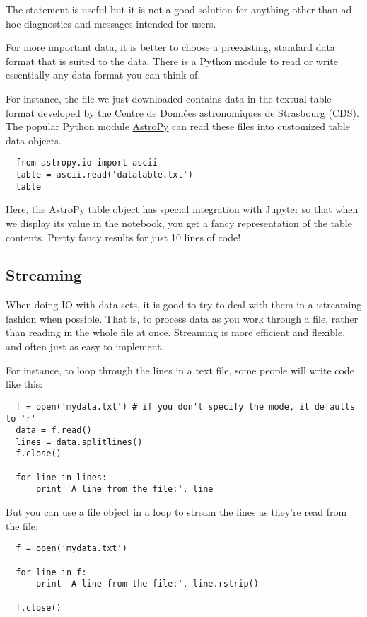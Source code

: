 \documentclass[letterpaper, 12pt, titlepage, twoside]{article}
\begin{document}
The  statement is useful but it is not a good solution for anything
other than ad-hoc diagnostics and messages intended for users.

For more important data, it is better to choose a preexisting, standard data
format that is suited to the data. There is a Python module to read or write
essentially any data format you can think of.

For instance, the file we just downloaded contains data in the textual table
format developed by the Centre de Données astronomiques de Strasbourg (CDS).
The popular Python module \href{http://www.astropy.org/}{AstroPy} can read
these files into customized table data objects.

\begin{lstlisting}
  from astropy.io import ascii
  table = ascii.read('datatable.txt')
  table
\end{lstlisting}

Here, the AstroPy table object has special integration with Jupyter so that
when we display its value in the notebook, you get a fancy representation of
the table contents. Pretty fancy results for just 10 lines of code!

\subsection*{Streaming}

When doing IO with data sets, it is good to try to deal with them in a
\i{streaming} fashion when possible. That is, to process data as you work
through a file, rather than reading in the whole file at once. Streaming is
more efficient and flexible, and often just as easy to implement.

For instance, to loop through the lines in a text file, some people will write
code like this:

\begin{lstlisting}
  f = open('mydata.txt') # if you don't specify the mode, it defaults to 'r'
  data = f.read()
  lines = data.splitlines()
  f.close()

  for line in lines:
      print 'A line from the file:', line
\end{lstlisting}

But you can use a file object in a  loop to stream the lines as they're
read from the file:

\begin{lstlisting}
  f = open('mydata.txt')

  for line in f:
      print 'A line from the file:', line.rstrip()

  f.close()
\end{lstlisting}
\end{document}
